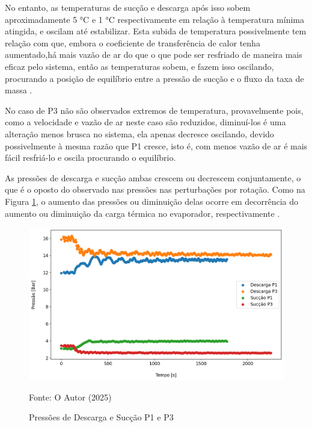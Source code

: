 No entanto, as temperaturas de sucção e descarga após isso sobem aproximadamente 5 °C  e 1 °C respectivamente em relação à temperatura mínima atingida, e oscilam até estabilizar. Esta subida de temperatura possivelmente tem relação com que, embora o coeficiente de transferência de calor tenha aumentado,há mais vazão de ar do que o que pode ser resfriado de maneira mais eficaz pelo sistema, então as temperaturas sobem, e fazem isso oscilando, procurando a posição de equilíbrio entre a pressão de sucção e o fluxo da taxa de massa \cite{StoekerRefrigeration}.  

No caso de P3 não são observados extremos de temperatura, provavelmente pois, como a velocidade e vazão de ar neste caso são reduzidos, diminuí-los é uma alteração menos brusca no sistema, ela apenas decresce oscilando, devido possivelmente à mesma razão que P1 cresce, isto é, com menos vazão de ar é mais fácil resfriá-lo e oscila procurando o equilíbrio.

As pressões de descarga e sucção ambas crescem ou decrescem conjuntamente, o que é o oposto do observado nas pressões nas perturbações por rotação. Como na Figura \ref{fig:Pressões de Sucção e Descarga P1 e P3}, o aumento das pressões ou diminuição delas ocorre em decorrência do aumento ou diminuição da carga térmica no evaporador, respectivamente \cite{EffectsOFRefrigeranteCompressorAirFlow}.

\begin{figure}[h]
    \centering
    \includegraphics[width=1\linewidth]{FigurasdoTexto/Pressões de Sucção e Descarga P1 e P3.png}
    \caption{Pressões de Descarga e Sucção P1 e P3}
    \label{fig:Pressões de Sucção e Descarga P1 e P3}
    {\footnotesize Fonte: O Autor (2025)}
\end{figure}

